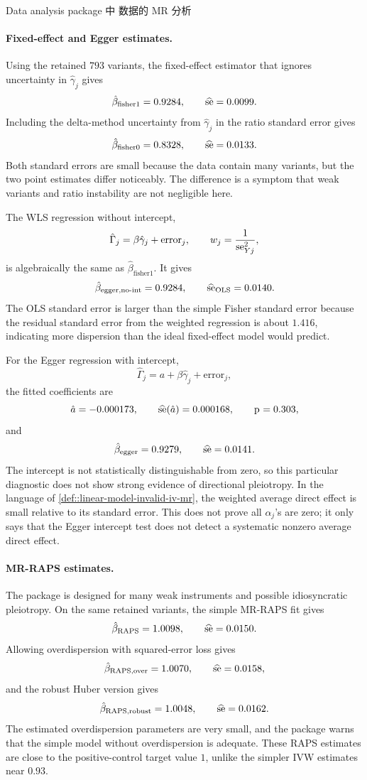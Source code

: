 \begin{exercisesolution}{Data analysis}{ package 中  数据的 MR 分析}
\paragraph{Fixed-effect and Egger estimates.}
Using the retained $793$ variants, the fixed-effect estimator that ignores uncertainty in $\hat{\gamma}_j$ gives
\[
\hat{\beta}_{\text{fisher}1}=0.9284,\qquad
\widehat{\textup{se}}=0.0099.
\]
Including the delta-method uncertainty from $\hat{\gamma}_j$ in the ratio standard error gives
\[
\hat{\beta}_{\text{fisher}0}=0.8328,\qquad
\widehat{\textup{se}}=0.0133.
\]
Both standard errors are small because the data contain many variants, but the two point estimates differ noticeably. The difference is a symptom that weak variants and ratio instability are not negligible here.

The WLS regression without intercept,
\[
\hat{\Gamma}_j=\beta\hat{\gamma}_j+\text{error}_j,
\qquad
w_j=\frac{1}{\textup{se}_{Yj}^2},
\]
is algebraically the same as $\hat{\beta}_{\text{fisher}1}$. It gives
\[
\hat{\beta}_{\text{egger,no-int}}=0.9284,
\qquad
\widehat{\textup{se}}_{\text{OLS}}=0.0140.
\]
The OLS standard error is larger than the simple Fisher standard error because the residual standard error from the weighted regression is about $1.416$, indicating more dispersion than the ideal fixed-effect model would predict.

For the Egger regression with intercept,
\[
\hat{\Gamma}_j=a+\beta\hat{\gamma}_j+\text{error}_j,
\]
the fitted coefficients are
\[
\hat a=-0.000173,\qquad
\widehat{\textup{se}}(\hat a)=0.000168,\qquad
\text{p}_{}=0.303,
\]
and
\[
\hat{\beta}_{\text{egger}}=0.9279,\qquad
\widehat{\textup{se}}=0.0141.
\]
The intercept is not statistically distinguishable from zero, so this particular diagnostic does not show strong evidence of directional pleiotropy. In the language of \cref{def::linear-model-invalid-iv-mr}, the weighted average direct effect is small relative to its standard error. This does not prove all $\alpha_j$'s are zero; it only says that the Egger intercept test does not detect a systematic nonzero average direct effect.

\paragraph{MR-RAPS estimates.}
The package  is designed for many weak instruments and possible idiosyncratic pleiotropy. On the same retained variants, the simple MR-RAPS fit gives
\[
\hat{\beta}_{\text{RAPS}}=1.0098,\qquad
\widehat{\textup{se}}=0.0150.
\]
Allowing overdispersion with squared-error loss gives
\[
\hat{\beta}_{\text{RAPS,over}}=1.0070,\qquad
\widehat{\textup{se}}=0.0158,
\]
and the robust Huber version gives
\[
\hat{\beta}_{\text{RAPS,robust}}=1.0048,\qquad
\widehat{\textup{se}}=0.0162.
\]
The estimated overdispersion parameters are very small, and the package warns that the simple model without overdispersion is adequate. These RAPS estimates are close to the positive-control target value $1$, unlike the simpler IVW estimates near $0.93$.


\end{exercisesolution}
